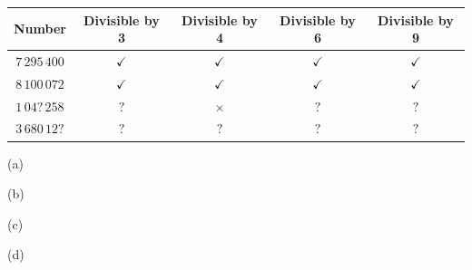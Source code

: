 

\begin{center}
\renewcommand{\arraystretch}{1.4}
\begin{tabular}{|c|c|c|c|c|}
\hline
\textbf{Number} & \textbf{Divisible by 3} & \textbf{Divisible by 4} & \textbf{Divisible by 6} & \textbf{Divisible by 9} \\
\hline
$7\,295\,400$ & $\checkmark$ & $\checkmark$ & $\checkmark$ & $\checkmark$ \\ \hline
$8\,100\,072$ & $\checkmark$ & $\checkmark$ & $\checkmark$ & $\checkmark$ \\ \hline
$1\,04?\,258$ & $?$ & $\times$ & $?$ & $?$ \\ \hline
$3\,680\,12?$ & $?$ & $?$ & $?$ & $?$ \\ \hline
\end{tabular}
\end{center}

\vspace{4pt}

\begin{mspart}{(a)}
\end{mspart}

\begin{mspart}{(b)}
\end{mspart}

\begin{mspart}{(c)}
\end{mspart}

\begin{mspart}{(d)}
\end{mspart}
